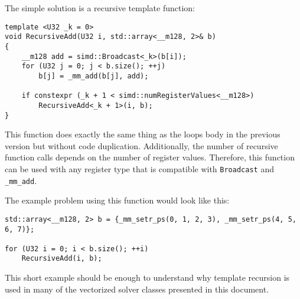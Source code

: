\documentclass[fontsize = 10pt,DIV = 13]{scrartcl}
\begin{document}
The simple solution is a recursive template function:

\begin{verbatim}
template <U32 _k = 0>
void RecursiveAdd(U32 i, std::array<__m128, 2>& b)
{
    __m128 add = simd::Broadcast<_k>(b[i]);
    for (U32 j = 0; j < b.size(); ++j)
        b[j] = _mm_add(b[j], add);

    if constexpr (_k + 1 < simd::numRegisterValues<__m128>)
        RecursiveAdd<_k + 1>(i, b);
}
\end{verbatim}

This function does exactly the same thing as the loops body in the previous version but without code duplication.
Additionally, the number of recursive function calls depends on the number of register values.
Therefore, this function can be used with any register type that is compatible with \texttt{Broadcast} and \texttt{_mm_add}.

The example problem using this function would look like this:

\begin{verbatim}
std::array<__m128, 2> b = {_mm_setr_ps(0, 1, 2, 3), _mm_setr_ps(4, 5, 6, 7)};

for (U32 i = 0; i < b.size(); ++i)
    RecursiveAdd(i, b);
\end{verbatim}

This short example should be enough to understand why template recursion is used in many of the vectorized solver classes presented in this document.
\end{document}
